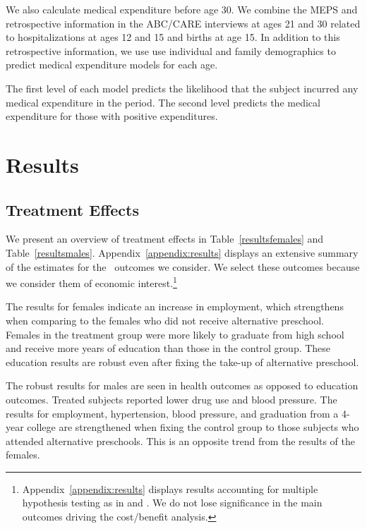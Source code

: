 We also calculate medical expenditure before age 30. We combine the MEPS and retrospective information in the ABC/CARE interviews at ages 21 and 30 related to hospitalizations at ages 12 and 15 and births at age 15. In addition to this retrospective information, we use use individual and family demographics to predict medical expenditure models for each age.

The first level of each model predicts the likelihood that the subject incurred any medical expenditure in the period. The second level predicts the medical expenditure for those with positive expenditures.

\section{Results} \label{section:results}

\subsection{Treatment Effects} \label{section:teresults}

We present an overview of treatment effects in Table~\ref{resultsfemales} and Table~\ref{resultsmales}. Appendix~\ref{appendix:results} displays an extensive summary of the estimates for the \noutcomes\ outcomes we consider. We select these outcomes because we consider them of economic interest.\footnote{Appendix~\ref{appendix:results} displays results accounting for multiple hypothesis testing as in \citet{Lehman_Romano_2005_AnnStat} and \citet{Romano_Shaikh_2006_AnnStat}. We do not lose significance in the main outcomes driving the cost/benefit analysis.}

The results for females indicate an increase in employment, which strengthens when comparing to the females who did not receive alternative preschool. Females in the treatment group were more likely to graduate from high school and receive more years of education than those in the control group. These education results are robust even after fixing the take-up of alternative preschool. 

The robust results for males are seen in health outcomes as opposed to education outcomes. Treated subjects reported lower drug use and blood pressure. The results for employment, hypertension, blood pressure, and graduation from a 4-year college are strengthened when fixing the control group to those subjects who attended alternative preschools. This is an opposite trend from the results of the females.

